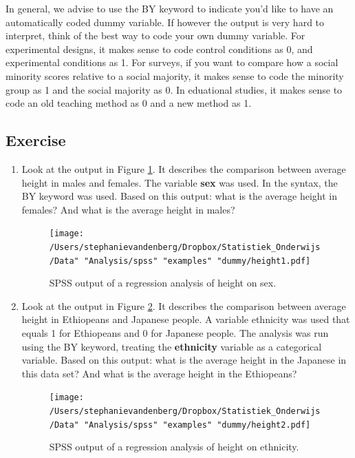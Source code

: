 \documentclass[]{report}\usepackage[]{graphicx}\usepackage[]{color}
\begin{document}
In general, we advise to use the BY keyword to indicate you'd like to have an automatically coded dummy variable. If however the output is very hard to interpret, think of the best way to code your own dummy variable. For experimental designs, it makes sense to code control conditions as 0, and experimental conditions as 1. For surveys, if you want to compare how a social minority scores relative to a social majority, it makes sense to code the minority group as 1 and the social majority as 0. In eduational studies, it makes sense to code an old teaching method as 0 and a new method as 1.  

\subsection{Exercise}

\begin{enumerate}

\item Look at the output in Figure \ref{fig:dummy_12}. It describes the comparison between average height in males and females. The variable \textbf{sex} was used. In the syntax, the BY keyword was used. Based on this output: what is the average height in females? And what is the average height in males?

\begin{figure}[h]
    \begin{center}
       \texttt{[image: /Users/stephanievandenberg/Dropbox/Statistiek\_Onderwijs/Data" "Analysis/spss" "examples" "dummy/height1.pdf]}
    \end{center}
 \caption{SPSS output of a regression analysis of height on sex.}
 \label{fig:dummy_12}
\end{figure}

\item Look at the output in Figure \ref{fig:dummy_13}. It describes the comparison between average height in Ethiopeans and Japanese people. A variable ethnicity was used that equals 1 for Ethiopeans and 0 for Japanese people. The analysis was run using the BY keyword, treating the \textbf{ethnicity} variable as a categorical variable. Based on this output: what is the average height in the Japanese in this data set? And what is the average height in the Ethiopeans?

\begin{figure}[h]
    \begin{center}
       \texttt{[image: /Users/stephanievandenberg/Dropbox/Statistiek\_Onderwijs/Data" "Analysis/spss" "examples" "dummy/height2.pdf]}
    \end{center}
 \caption{SPSS output of a regression analysis of height on ethnicity.}
 \label{fig:dummy_13}
\end{figure}


\end{enumerate}
\end{document}
